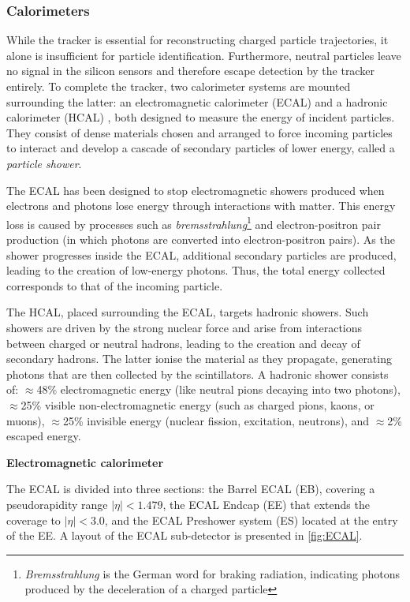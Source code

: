 \subsubsection{Calorimeters}

While the tracker is essential for reconstructing charged particle trajectories, it alone is insufficient for particle identification. Furthermore, neutral particles leave no signal in the silicon sensors and therefore escape detection by the tracker entirely. To complete the tracker, two calorimeter systems are mounted surrounding the latter: an electromagnetic calorimeter (ECAL) \cite{CMSecal} and a hadronic calorimeter (HCAL) \cite{CMShcal}, both designed to measure the energy of incident particles. They consist of dense materials chosen and arranged to force incoming particles to interact and develop a cascade of secondary particles of lower energy, called a \textit{particle shower}. 

The ECAL has been designed to stop electromagnetic showers produced when electrons and photons lose energy through interactions with matter. This energy loss is caused by processes such as \textit{bremsstrahlung}\footnote{\textit{Bremsstrahlung} is the German word for braking radiation, indicating photons produced by the deceleration of a charged particle} and electron-positron pair production (in which photons are converted into electron-positron pairs). As the shower progresses inside the ECAL, additional secondary particles are produced, leading to the creation of low-energy photons. Thus, the total energy collected corresponds to that of the incoming particle.

The HCAL, placed surrounding the ECAL, targets hadronic showers. Such showers are driven by the strong nuclear force and arise from interactions between charged or neutral hadrons, leading to the creation and decay of secondary hadrons. The latter ionise the material as they propagate, generating photons that are then collected by the scintillators. A hadronic shower consists of: $\approx$48\% electromagnetic energy (like neutral pions decaying into two photons), $\approx$25\% visible non-electromagnetic energy (such as charged pions, kaons, or muons), $\approx$25\% invisible energy (nuclear fission, excitation, neutrons), and $\approx$2\% escaped energy.

\vspace{0.5 cm}
\noindent \textbf{Electromagnetic calorimeter}
\vspace{0.5 cm}

The ECAL is divided into three sections: the Barrel ECAL (EB), covering a pseudorapidity range $|\eta|<1.479$, the ECAL Endcap (EE) that extends the coverage to $|\eta|<3.0$, and the ECAL Preshower system (ES) located at the entry of the EE. A layout of the ECAL sub-detector is presented in \cref{fig:ECAL}.

